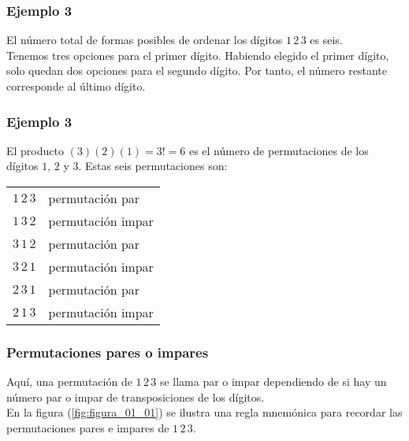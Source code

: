 \documentclass[12pt]{beamer}
\begin{document}
\begin{frame}
\frametitle{Ejemplo 3}
El número total de formas posibles de ordenar los dígitos $1 \, 2 \, 3$ es seis.
\\
\bigskip
\pause
Tenemos tres opciones para el primer dígito. Habiendo elegido el primer dígito, solo quedan dos opciones para el segundo dígito. Por tanto, el número restante corresponde al último dígito.
\end{frame}
\begin{frame}
\frametitle{Ejemplo 3}
El producto $(3) (2) (1) = 3! = 6$ es el número de permutaciones de los dígitos $1$, $2$ y $3$. Estas seis permutaciones son:
\fontsize{11}{11}\selectfont
\begin{table}[H]
\centering
\begin{tabular}{c l}
$1 \, 2 \, 3$ & permutación par \\
$1 \, 3 \, 2$ & permutación impar \\
$3 \, 1 \, 2$ & permutación par \\
$3 \, 2 \, 1$ & permutación impar \\
$2 \, 3 \, 1$ & permutación par \\
$2 \, 1 \, 3$ & permutación impar \\
\end{tabular}
\end{table}
\end{frame}
\begin{frame}
\frametitle{Permutaciones pares o impares}
Aquí, una permutación de $1 \, 2 \, 3$ se llama par o impar dependiendo de si hay un número par o impar de transposiciones de los dígitos. 
\\
\bigskip
En la figura (\ref{fig:figura_01_01}) se ilustra una regla mnemónica para recordar las permutaciones pares e impares de $1 \, 2 \, 3$. 
\end{frame}
\end{document}
